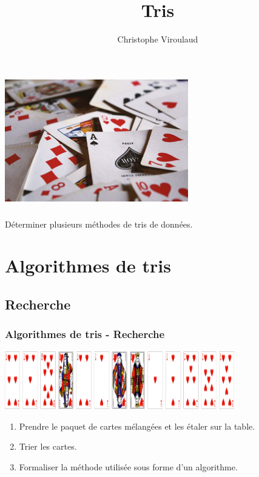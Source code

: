 \documentclass[svgnames,11pt]{beamer}
\author[]{Christophe Viroulaud}
\title{Tris}
\date{\framebox{\textbf{Algo 04}}}
\institute{Première - NSI}
\begin{document}
\begin{frame}
    \titlepage
\end{frame}
\begin{frame}
    \frametitle{}

    \begin{center}
        \centering
        \includegraphics[width=8cm]{ressources/cartes.jpg}
        \label{IMG}
    \end{center}

\end{frame}
\begin{frame}
    \frametitle{}

    \begin{framed}
        \centering Déterminer plusieurs méthodes de tris de données.
    \end{framed}

\end{frame}
\section{Algorithmes de tris}
\subsection{Recherche}
\begin{frame}
    \frametitle{Algorithmes de tris - Recherche}
    \begin{center}
        \centering
        \includegraphics[width=10cm]{ressources/jeu-coeur-melange.png}
        \end{center}
    \begin{activite}
        \begin{enumerate}
            \item Prendre le paquet de cartes mélangées et les étaler sur la table.
            \item Trier les cartes.
            \item Formaliser la méthode utilisée sous forme d'un algorithme.
        \end{enumerate}
    \end{activite}

\end{frame}
\end{document}
